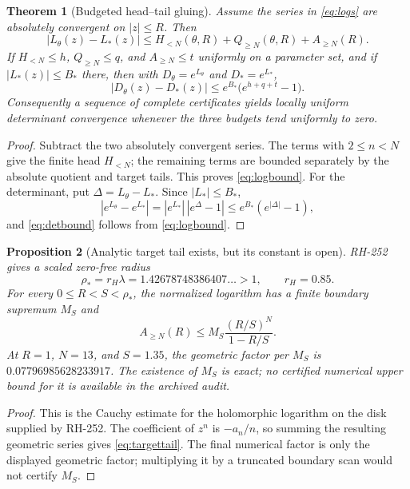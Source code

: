 \documentclass[11pt]{article}
\newtheorem{theorem}{Theorem}[section]
\newtheorem{proposition}[theorem]{Proposition}
\theoremstyle{definition}
\theoremstyle{remark}
\begin{document}
\begin{theorem}[Budgeted head--tail gluing]\label{thm:gluing}
Assume the series in \eqref{eq:logs} are absolutely convergent on
$|z|\le R$.  Then
\begin{equation}
 |L_\theta(z)-L_*(z)|
 \le H_{<N}(\theta,R)+Q_{\ge N}(\theta,R)+A_{\ge N}(R).
 \label{eq:logbound}
\end{equation}
If $H_{<N}\le h$, $Q_{\ge N}\le q$, and $A_{\ge N}\le t$ uniformly on a
parameter set, and if $|L_*(z)|\le B_*$ there, then with
$D_\theta=e^{L_\theta}$ and $D_*=e^{L_*}$,
\begin{equation}
 |D_\theta(z)-D_*(z)|
 \le e^{B_*}\bigl(e^{h+q+t}-1\bigr).
 \label{eq:detbound}
\end{equation}
Consequently a sequence of complete certificates yields locally uniform
determinant convergence whenever the three budgets tend uniformly to zero.
\end{theorem}

\begin{proof}
Subtract the two absolutely convergent series.  The terms with
$2\le n<N$ give the finite head $H_{<N}$; the remaining terms are
bounded separately by the absolute quotient and target tails.  This proves
\eqref{eq:logbound}.  For the determinant, put
$\Delta=L_\theta-L_*$.  Since $|L_*|\le B_*$,
\[
 |e^{L_\theta}-e^{L_*}|
 =|e^{L_*}|\,|e^\Delta-1|
 \le e^{B_*}(e^{|\Delta|}-1),
\]
and \eqref{eq:detbound} follows from \eqref{eq:logbound}.
\end{proof}

\begin{proposition}[Analytic target tail exists, but its constant is open]
\label{prop:target}
RH-252 \citep{WangRH252} gives a scaled zero-free radius
\[
 \rho_*=r_H\lambda=1.42678748386407\ldots>1,
 \qquad r_H=0.85.
\]
For every $0\le R<S<\rho_*$, the normalized logarithm has a finite
boundary supremum $M_S$ and
\begin{equation}
 A_{\ge N}(R)\le M_S\frac{(R/S)^N}{1-R/S}.
 \label{eq:targettail}
\end{equation}
At $R=1$, $N=13$, and $S=1.35$, the geometric factor per $M_S$ is
$0.07796985628233917$.  The existence of $M_S$ is exact; no certified
numerical upper bound for it is available in the archived audit.
\end{proposition}

\begin{proof}
This is the Cauchy estimate for the holomorphic logarithm on the disk supplied
by RH-252.  The coefficient of $z^n$ is $-a_n/n$, so summing the resulting
geometric series gives \eqref{eq:targettail}.  The final numerical factor is
only the displayed geometric factor; multiplying it by a truncated boundary
scan would not certify $M_S$.
\end{proof}
\end{document}
